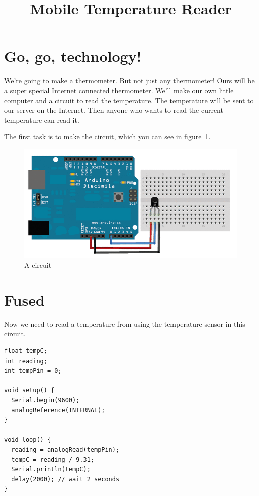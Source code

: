 \documentclass[a5paper]{tufte-book}
\title{Mobile Temperature Reader}
\author{}
\date{}
\begin{document}
\maketitle

\section*{Go, go, technology!}
We're going to make a thermometer.  But not just any thermometer!  Ours will be a super special Internet connected thermometer.  We'll make our own little computer and a circuit to read the temperature.  The temperature will be sent to our server on the Internet.  Then anyone who wants to read the current temperature can read it.

The first task is to make the circuit, which you can see in figure~\ref{fig:circuit}.

\begin{figure}
  \includegraphics[width=\textwidth]{images/temperature_tmp36fritz}
  \caption{A circuit}
  \label{fig:circuit}
\end{figure}

\section*{Fused}

Now we need to read a temperature from using the temperature sensor in this circuit.

\begin{lstlisting}
float tempC;
int reading;
int tempPin = 0;

void setup() {
  Serial.begin(9600);
  analogReference(INTERNAL);
}

void loop() {
  reading = analogRead(tempPin);
  tempC = reading / 9.31;
  Serial.println(tempC);
  delay(2000); // wait 2 seconds
}

\end{lstlisting}
\end{document}
